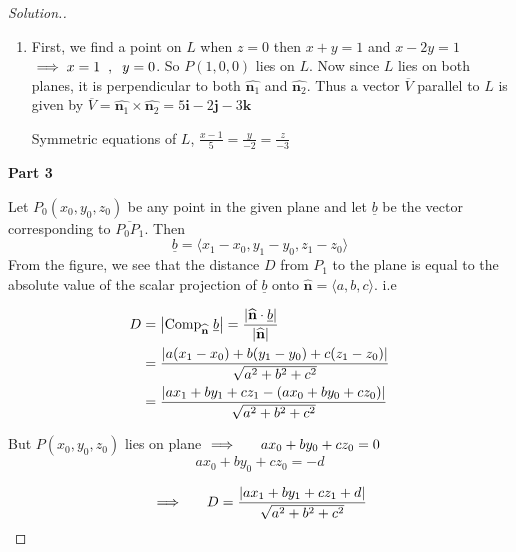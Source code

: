 \documentclass[11pt,a4paper]{article}
\theoremstyle{definition}
\newenvironment{solution}
  {\renewcommand{\qedsymbol}{}\begin{proof}[\textit{Solution}.]}
  {\end{proof}}
\newcommand{\subhead}[1]{%
  \par\medskip\noindent\textbf{#1}\par\nobreak\smallskip}
\begin{document}
\begin{solution}
\begin{enumerate}
\item First, we find a point on $L$ when $z = 0$ then $x + y = 1$ and $x - 2y = 1$\\ $\implies x = 1\hspace{0.2cm}, \hspace{0.2cm} y  = 0$. So $P(1,0,0)$ lies on $L$.
Now since $L$ lies on both planes, it is perpendicular to both $\hat{\textbf{n}_1}$ and $\hat{\textbf{n}_2}$. Thus a vector $\overline{V}$ parallel to $L$ is given by \hspace{0.2cm}$\overline{V} = \hat{\textbf{n}_1}\times \hat{\textbf{n}_2} = 5\textbf{i} - 2\textbf{j} -3\textbf{k}$

Symmetric equations of $L$,\hspace{0.3cm}
$\displaystyle{\frac{x - 1}{5} = \frac{y}{-2} = \frac{z}{-3}}$ 
\end{enumerate}

\subhead{Part 3}

\begin{figure}[H]
\centering
{}
\end{figure}

Let $P_0(x_0,y_0,z_0)$ be any point in the given plane and let $\underline{b}$ be the vector corresponding to $\overline{P_0P_1}$. Then $$\underline{b} =\langle x_1 - x_0 , y_1 - y_0 , z_1 - z_0 \rangle$$
From the figure, we see that the distance $D$ from $P_1$ to the plane is equal to the absolute value of the scalar projection of $\underline{b}$ onto $\widehat{\textbf{n}} = \langle a, b, c\rangle$. i.e 

\begin{align*}
D & = \left|\text{Comp} _{\widehat{\textbf{n}}}\hspace{0.1cm} \underline{b}\right| = \frac{
\left|\widehat{\textbf{n}}\cdot \underline{b}\right|
}{\left|\widehat{\textbf{n}}\right|
}\\
& = \frac{
\left|a(x_1-x_0) + b (y_1 -y_0) + c(z_1 -z_0)\right|
}{\sqrt{a^2 + b^2 + c^2}}\\
& = \frac{\left|ax_1 + by_1 + cz_1 - (ax_0 + by_0 + cz_0)\right|
}{ \sqrt{a^2 + b^2 + c^2}}
\end{align*}

But $P(x_0,y_0,z_0)$ lies on plane
$\implies\hspace{0.5cm} ax_0 + by_0 + cz_0 = 0$
$$ax_0 + by_0 + cz_0 = -d$$

$$\implies \hspace{0.5cm} D = \frac{\left|ax_1 + by_1 + cz_1 + d\right|
}{ \sqrt{a^2 + b^2 + c^2}}$$
\end{solution}
\end{document}
